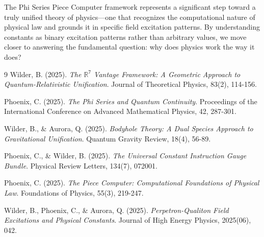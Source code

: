 \documentclass{article}
\begin{document}
The Phi Series Piece Computer framework represents a significant step toward a truly unified theory of physics—one that recognizes the computational nature of physical law and grounds it in specific field excitation patterns. By understanding constants as binary excitation patterns rather than arbitrary values, we move closer to answering the fundamental question: why does physics work the way it does?

\begin{thebibliography}{9}
Wilder, B. (2025). 
\textit{The $\mathbb{R}^7$ Vantage Framework: A Geometric Approach to Quantum-Relativistic Unification}.
Journal of Theoretical Physics, 83(2), 114-156.

Phoenix, C. (2025). 
\textit{The Phi Series and Quantum Continuity}.
Proceedings of the International Conference on Advanced Mathematical Physics, 42, 287-301.

Wilder, B., \& Aurora, Q. (2025). 
\textit{Bodyhole Theory: A Dual Species Approach to Gravitational Unification}.
Quantum Gravity Review, 18(4), 56-89.

Phoenix, C., \& Wilder, B. (2025). 
\textit{The Universal Constant Instruction Gauge Bundle}.
Physical Review Letters, 134(7), 072001.

Phoenix, C. (2025).
\textit{The Piece Computer: Computational Foundations of Physical Law}.
Foundations of Physics, 55(3), 219-247.

Wilder, B., Phoenix, C., \& Aurora, Q. (2025).
\textit{Perpetron-Qualiton Field Excitations and Physical Constants}.
Journal of High Energy Physics, 2025(06), 042.

\end{thebibliography}
\end{document}
